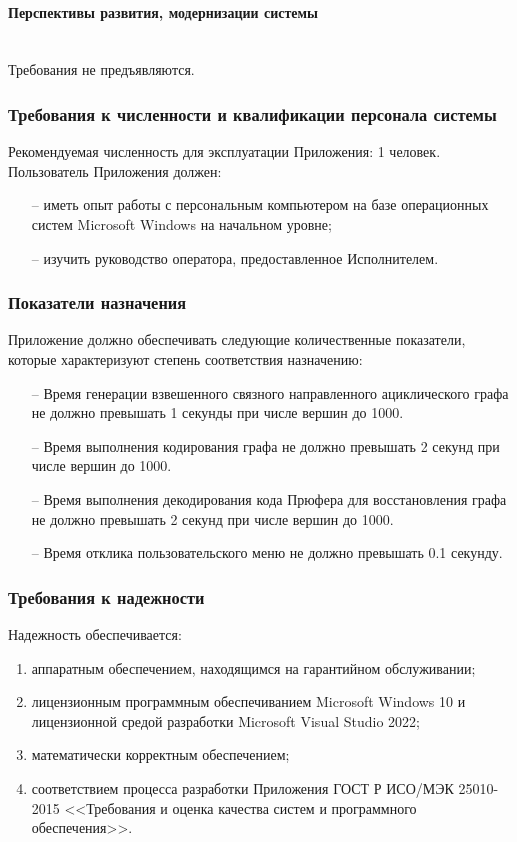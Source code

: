 \documentclass[12pt,a4paper]{article}
\begin{document}
\paragraph{Перспективы развития, модернизации системы}\mbox{}\medskip\\
Требования не предъявляются.

\subsubsection{Требования к численности и квалификации персонала системы}\label{412}
Рекомендуемая численность для эксплуатации Приложения: 1 человек. \\

\noindent Пользователь Приложения должен:
\begin{itemize}
    \item[--] иметь опыт работы с персональным компьютером на базе операционных систем Microsoft Windows на начальном уровне;
    \item[--] изучить руководство оператора, предоставленное Исполнителем.
\end{itemize}

\subsubsection{Показатели назначения}
Приложение должно обеспечивать следующие количественные показатели, которые характеризуют степень соответствия назначению:
\begin{itemize}
    \item[--] Время генерации взвешенного связного направленного ациклического графа не должно превышать 1 секунды
    при числе вершин до 1000.
    \item[--] Время выполнения кодирования графа не должно превышать 2 секунд при числе вершин до 1000.
    \item[--] Время выполнения декодирования кода Прюфера для восстановления графа не должно превышать 2 секунд 
    при числе вершин до 1000.
    \item[--] Время отклика пользовательского меню не должно превышать 0.1 секунду.
\end{itemize}

\subsubsection{Требования к надежности}
Надежность обеспечивается:
\begin{enumerate}
    \item аппаратным обеспечением, находящимся на гарантийном обслуживании;
    \item лицензионным программным обеспечиванием Microsoft Windows 10 и лицензионной средой разработки Microsoft 
    Visual Studio 2022;
    \item математически корректным обеспечением;
    \item соответствием процесса разработки Приложения ГОСТ Р ИСО/МЭК 25010-2015 <<Требования и оценка качества 
    систем и программного обеспечения>>.
\end{enumerate}
\end{document}
